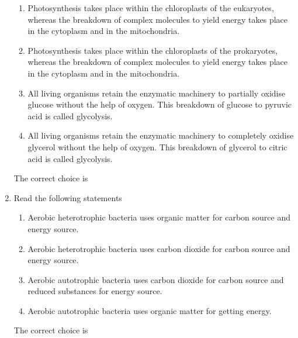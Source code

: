\documentclass[journal,12pt,onecolumn]{IEEEtran}
\theoremstyle{remark}
\begin{document}
\begin{enumerate}
\begin{enumerate}[label=\Roman*.]
\item Photosynthesis takes place within the chloroplasts of the eukaryotes, whereas the breakdown of complex molecules to yield energy takes place in the cytoplasm and in the mitochondria.
\item Photosynthesis takes place within the chloroplasts of the prokaryotes, whereas the breakdown of complex molecules to yield energy takes place in the cytoplasm and in the mitochondria.
\item All living organisms retain the enzymatic machinery to partially oxidise glucose without the help of oxygen. This breakdown of glucose to pyruvic acid is called glycolysis.
\item All living organisms retain the enzymatic machinery to completely oxidise glycerol without the help of oxygen. This breakdown of glycerol to citric acid is called glycolysis.
\end{enumerate}

The correct choice is

\begin{enumerate}
\end{enumerate}
\hfill{}
\item Read the following statements

\begin{enumerate}[label=\roman*.]
\item Aerobic heterotrophic bacteria uses organic matter for carbon source and energy source.
\item Aerobic heterotrophic bacteria uses carbon dioxide for carbon source and energy source.
\item Aerobic autotrophic bacteria uses carbon dioxide for carbon source and reduced substances for energy source.
\item Aerobic autotrophic bacteria uses organic matter for getting energy.
\end{enumerate}

The correct choice is

\begin{enumerate}
\end{enumerate}
\hfill{}


\end{enumerate}
\end{document}
